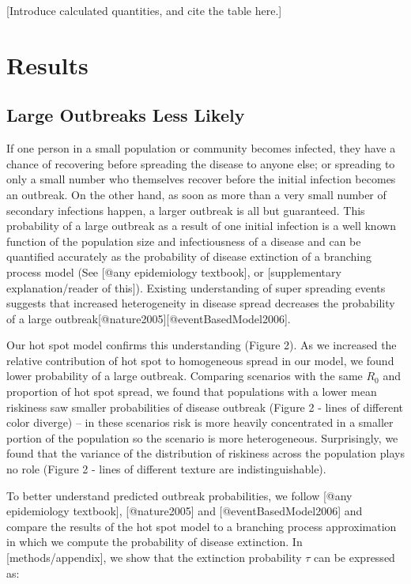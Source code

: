 \documentclass[9pt,twocolumn,twoside, lineno]{pnas-new}
\begin{document}
[Introduce calculated quantities, and cite the table here.]


\section*{Results}

\subsection*{Large Outbreaks Less Likely}

If one person in a small population or community becomes infected, they have a
chance of recovering before spreading the disease to anyone else; or spreading
to only a small number who themselves recover before the initial infection
becomes an outbreak. On the other hand, as soon as more than a very small
number of secondary infections happen, a larger outbreak is all but guaranteed.
This probability of a large outbreak as a result of one initial
infection is a well known function of the population size and infectiousness of
a disease and can be quantified accurately as the probability of disease extinction
of a branching process model (See [@any epidemiology textbook], or
[supplementary explanation/reader of this]).
Existing understanding of super spreading events suggests that increased
heterogeneity in disease spread decreases the probability of a large
outbreak[@nature2005][@eventBasedModel2006].


Our hot spot model confirms this understanding (Figure 2). 
As we increased the relative contribution of hot spot to homogeneous spread in
our model, we found lower probability of a large outbreak. Comparing scenarios
with the same $R_0$ and proportion of hot spot spread, we
found that populations with a lower mean riskiness saw smaller probabilities of
disease outbreak (Figure 2 - lines of different color diverge) –
in these scenarios risk is more heavily concentrated in a smaller portion of the
population so the scenario is more heterogeneous.
Surprisingly, we found that the variance of the distribution of riskiness
across the population plays no role (Figure 2 - lines of different
texture are indistinguishable).

To better understand predicted outbreak probabilities, we follow
[@any epidemiology textbook], [@nature2005] and [@eventBasedModel2006] and
compare the results of the hot spot model to a branching process approximation
in which we compute the probability of disease extinction. In [methods/appendix], 
we show that the extinction probability $\tau$ can be expressed as:
\end{document}
